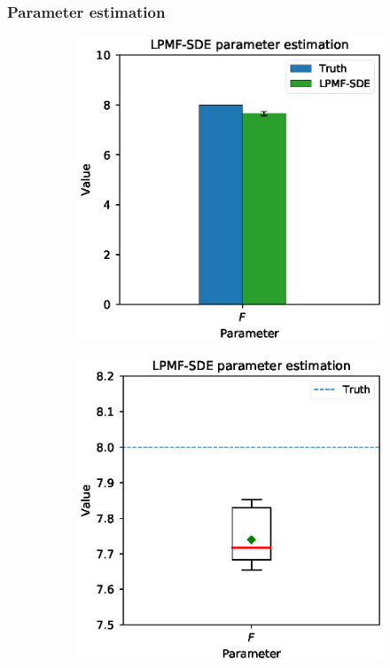 \begin{frame}[t]
    \frametitle{Parameter estimation}
    \begin{figure}
        \centering
        \begin{subfigure}[b]{0.32\textwidth}
            \includegraphics[width=\linewidth]{graphics/lorenz-96-parameters}
            \label{fig-lorenz-96-parameters}
        \end{subfigure}
        \begin{subfigure}[b]{0.32\textwidth}
            \includegraphics[width=\linewidth]{graphics/lorenz-96-parameters-boxplot}

\end{subfigure}
\end{figure}
\end{frame}
